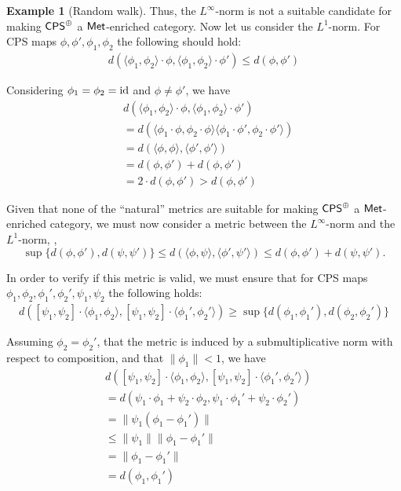 \documentclass[10pt,a4paper]{amsart}
\theoremstyle{definition}
\theoremstyle{definition}
\newtheorem{example}[definition]{Example}
\theoremstyle{definition}
\theoremstyle{definition}
\theoremstyle{definition}
\theoremstyle{definition}
\begin{document}
\begin{example}[Random walk]
Thus, the $L^{\infty}$-norm is not a suitable candidate for making $\mathsf{CPS}^{\oplus}$ a $\mathsf{Met}$-enriched category. Now let us consider the $L^{1}$-norm. For CPS maps $ \phi, \phi', \phi_1, \phi_2$ the following should hold:
\begin{align*}
  d( \langle \phi_1, \phi_2 \rangle \cdot \phi, \langle \phi_1, \phi_2 \rangle \cdot \phi' ) \leq d(\phi, \phi')
\end{align*}

Considering $\phi_1=\phi_2 = \mathrm{id}$ and $\phi \neq \phi'$, we have
\begin{align*}
  & d( \langle \phi_1, \phi_2 \rangle \cdot \phi, \langle \phi_1, \phi_2 \rangle \cdot \phi' )  \\
  & = d(  \langle \phi_1 \cdot \phi, \phi_2 \cdot \phi \rangle \langle \phi_1 \cdot \phi', \phi_2 \cdot \phi' \rangle ) \\
  & = d(  \langle  \phi, \phi \rangle, \langle  \phi',  \phi' \rangle  )  \\
  & = d(  \phi,  \phi'  ) +  d(  \phi,  \phi'  ) \\
  & = 2 \cdot d(  \phi,  \phi'  ) > d(  \phi,  \phi'  )
\end{align*}

Given that none of the ``natural'' metrics are suitable for making $\mathsf{CPS}^{\oplus}$ a $\mathsf{Met}$-enriched category, we must now consider a metric between the $L^{\infty}$-norm and the $L^{1}$-norm, \ie, $$\sup \{ d(\phi, \phi' ), d(\psi, \psi') \} \leq d(\langle \phi, \psi \rangle, \langle \phi', \psi' \rangle ) \leq d(\phi, \phi' ) +  d(\psi, \psi').$$

In order to verify if this metric is valid,  we must ensure that for CPS maps $\phi_1, \phi_2,  \phi_1', \phi_2', \psi_1, \psi_2$ the following holds:
\begin{align*}
  d([\psi_1, \psi_2] \cdot \langle \phi_1, \phi_2 \rangle, [\psi_1, \psi_2] \cdot \langle \phi_1', \phi_2' \rangle ) \geq \sup \{ d(\phi_1, \phi_1' ), d(\phi_2, \phi_2') \}
\end{align*}

Assuming \(\phi_2 = \phi_2'\), that the metric is induced by a submultiplicative norm with respect to composition, and that \(\|\phi_1\| < 1\), we have
\begin{align*}
  & d([\psi_1, \psi_2] \cdot \langle \phi_1, \phi_2 \rangle, [\psi_1, \psi_2] \cdot \langle \phi_1', \phi_2' \rangle ) \\
  & = d(\psi_1 \cdot \phi_1 + \psi_2 \cdot \phi_2, \psi_1 \cdot \phi_1' + \psi_2 \cdot \phi_2') \\
  & = \lVert \psi_1 (\phi_1- \phi_1' ) \lVert \\
  & \leq    \lVert \psi_1  \lVert  \lVert \phi_1- \phi_1'  \lVert \\
  & = \lVert \phi_1- \phi_1'  \lVert  \\
    & =  d(\phi_1, \phi_1' )
\end{align*}


\end{example}
\end{document}
